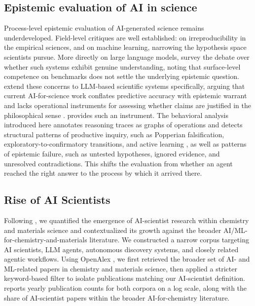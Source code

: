 \subsection{Epistemic evaluation of AI in science}

Process-level epistemic evaluation of AI-generated science remains underdeveloped. Field-level critiques are well established: \textcite{ioannidis2015meta} on irreproducibility in the empirical sciences, and \textcite{hao2026artificial} on machine learning, narrowing the hypothesis space scientists pursue. More directly on large language models, \textcite{Mitchell2023} survey the debate over whether such systems exhibit genuine understanding, noting that surface-level competence on benchmarks does not settle the underlying epistemic question. \textcite{pittphilsci28744} extend these concerns to LLM-based scientific systems specifically, arguing that current AI-for-science work conflates predictive accuracy with epistemic warrant and lacks operational instruments for assessing whether claims are justified in the philosophical sense \autocite{sep-knowledge-analysis}. \corral provides such an instrument. The behavioral analysis introduced here annotates reasoning traces as graphs of operations and detects structural patterns of productive inquiry, such as Popperian falsification, exploratory-to-confirmatory transitions, and active learning \autocite{popper2005logic, tukey1977exploratory, lindley1956measure, fedorov2013theory}, as well as patterns of epistemic failure, such as untested hypotheses, ignored evidence, and unresolved contradictions. This shifts the evaluation from whether an agent reached the right answer to the process by which it arrived there.

\subsection{Rise of AI Scientists} \label{app:rise_of_ai_scientists}

Following \textcite{hao2026artificial}, we quantified the emergence of AI-scientist research within chemistry and materials science and contextualized its growth against the broader AI/ML-for-chemistry-and-materials literature. We constructed a narrow corpus targeting AI scientists, LLM agents, autonomous discovery systems, and closely related agentic workflows. Using OpenAlex \autocite{priem2022openalex}, we first retrieved the broader set of AI- and ML-related papers in chemistry and materials science, then applied a stricter keyword-based filter to isolate publications matching our AI-scientist definition.  reports yearly publication counts for both corpora on a log scale, along with the share of AI-scientist papers within the broader AI-for-chemistry literature.

